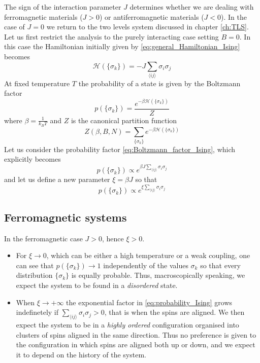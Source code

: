 The sign of the interaction parameter $J$ determines whether we are dealing with ferromagnetic materials ($J>0$) or antiferromagnetic materials ($J < 0$). In the case of $J=0$
we return to the two levels system discussed in chapter \ref{ch:TLS}. \\
Let us first restrict the analysis to the purely interacting case setting $B=0$. In this case the Hamiltonian initially given by \ref{eq:general_Hamiltonian_Ising} becomes
\begin{equation*}
    \mathcal{H}(\{\sigma_k\}) = -J \sum_{\langle i j\rangle}\sigma_{i} \sigma_{j}
\end{equation*}
At fixed temperature $T$ the probability of a state is given by the Boltzmann factor
\begin{equation}
    p(\{\sigma_k\}) = \frac{e^{-\beta\mathcal{H}(\{\sigma_k\})}}{Z}
    \label{eq:Boltzmann_factor_Ising}
\end{equation}
where $\beta = \frac{1}{k_BT}$ and $Z$ is the canonical partition function
\begin{equation*}
    Z(\beta, B, N) = \sum_{\{\sigma_k\}} e^{-\beta\mathcal{H}(\{\sigma_k\})}
\end{equation*}
Let us consider the probability factor \ref{eq:Boltzmann_factor_Ising}, which explicitly becomes 
\begin{equation*}
    p(\{\sigma_k\}) \propto e^{\beta J \sum_{\langle i j\rangle}\sigma_{i} \sigma_{j}}
\end{equation*}
and let us define a new parameter $\xi = \beta J$ so that 
\begin{equation}
    p(\{\sigma_k\}) \propto e^{\xi \sum_{\langle i j\rangle}\sigma_{i} \sigma_{j}}
    \label{eq:probability_Ising}
\end{equation}

\subsection{Ferromagnetic systems}
\label{subsec:ferromagnetic}
In the ferromagnetic case $J > 0$, hence $\xi > 0$. 
\begin{itemize}
    \item For $\xi \to 0$, which can be either a high temperature or a weak coupling, one can see that 
    $p(\{\sigma_k\}) \to 1$ independently of the values $\sigma_k$ so that every distribution $\{\sigma_k\}$ is equally probable. 
    Thus, macroscopically speaking, we expect the system to be found in a \emph{disordered} state.
    \item When $\xi \to +\infty$ the exponential factor in \ref{eq:probability_Ising} grows indefinetely if $\sum_{\langle i j\rangle}\sigma_{i} \sigma_{j} > 0$, that is when the spins are aligned.
    We then expect the system to be in a \emph{highly ordered} configuration organised into clusters of spins aligned in the same direction.
    Thus no preference is given to the configuration in which spins are aligned both up or down, and we expect it to depend on the history of the system. \\
\end{itemize}
